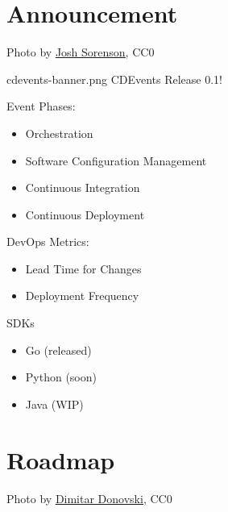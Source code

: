 \documentclass[aspectratio=169,11pt,hyperref={colorlinks=true}]{beamer}
\begin{document}
\section{Announcement}
\begin{sectionwithpiclargecentral}{Photo by \href{https://unsplash.com/@joshsorenson}{\underline{Josh Sorenson}}, CC0}
\end{sectionwithpiclargecentral}

\begin{tpicstripedframe}%
  {cdevents-banner.png}
  {%
  \large{CDEvents Release 0.1!}
  }%
  {%
  Event Phases:
  \begin{itemize}
    \item Orchestration
    \item Software Configuration Management
    \item Continuous Integration
    \item Continuous Deployment
  \end{itemize}
  }%
  {%
  DevOps Metrics:
  \begin{itemize}
    \item Lead Time for Changes
    \item Deployment Frequency
  \end{itemize}
  }%
  {%
  SDKs \\
  \vspace{0.01\textheight}
  \begin{itemize}
    \item Go (released)
    \item Python (soon)
    \item Java (WIP)
  \end{itemize}
  }%
\end{tpicstripedframe}

\section{Roadmap}
\begin{sectionwithpiclargecentral}{Photo by \href{https://unsplash.com/@dmtrdon}{\underline{Dimitar Donovski}}, CC0}
\end{sectionwithpiclargecentral}
\end{document}
